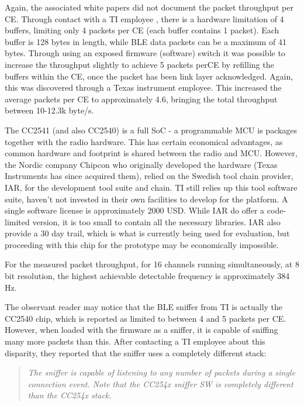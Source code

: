 \documentclass[]{article}
\begin{document}
Again, the associated white papers did not document the packet throughput per \ac{CE}. Through contact with a \ac{TI} employee \cite{tiem}, there is a hardware limitation of 4 buffers, limiting only 4 packets per \ac{CE} (each buffer contains 1 packet). Each buffer is 128 bytes in length, while \ac{BLE} data packets can be a maximum of 41 bytes. Through using an exposed firmware (software) switch it was possible to increase the throughput slightly to achieve 5 packets per\ac{CE} by refilling the buffers within the \ac{CE}, once the packet has been link layer acknowledged. Again, this was discovered through a Texas instrument employee. This increased the average packets per \ac{CE} to approximately 4.6, bringing the total throughput between 10-12.3k byte/s.

The CC2541 (and also CC2540) is a full \ac{SoC} - a programmable \ac{MCU} is packages together with the radio hardware. This has certain economical advantages, as common hardware and footprint is shared between the radio and \ac{MCU}. However, the Nordic company Chipcon who originally developed the hardware (Texas Instruments has since acquired them), relied on the Swedish tool chain provider, IAR, for the development tool suite and chain. \ac{TI} still relies up this tool software suite, haven't not invested in their own facilities to develop for the platform. A single software license is approximately 2000 USD. While IAR do offer a code-limited version, it is too small to contain all the necessary libraries. IAR also provide a 30 day trail, which is what is currently being used for evaluation, but proceeding with this chip for the prototype may be economically impossible.

For the measured packet throughput, for 16 channels running simultaneously, at 8 bit resolution, the highest achievable detectable frequency is approximately 384 Hz.

The observant reader may notice that the \ac{BLE} sniffer from \ac{TI} is actually the CC2540 chip, which is reported as limited to between 4 and 5 packets per \ac{CE}. However, when loaded with the firmware as a sniffer, it is capable of sniffing many more packets than this. After contacting a \ac{TI} employee about this disparity, they reported that the sniffer uses a completely different stack:

\begin{quote}\itshape The sniffer is capable of listening to any number of packets during a single connection event. Note that the CC254x sniffer SW is completely different than the CC254x stack.\end{quote}
\end{document}
